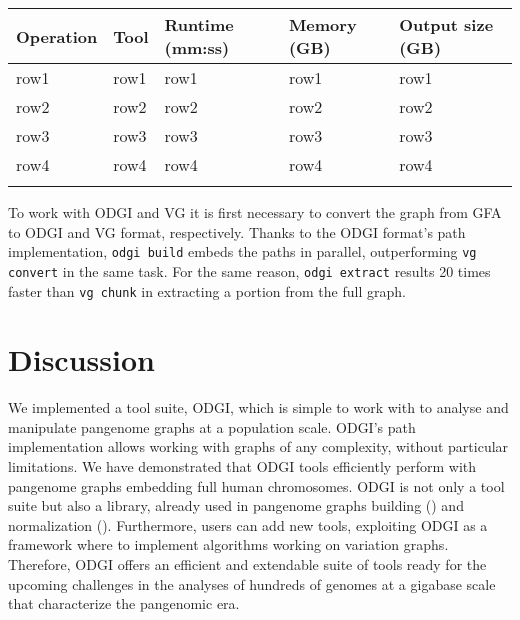 \documentclass{bioinfo}
\begin{document}
    \begin{table}[!t]
         {
            \begin{tabular}{@{}lllll@{}}
                \toprule Operation & Tool & Runtime (mm:ss) & Memory (GB) & Output size (GB) \\
                \midrule
                row1               & row1 & row1            & row1        & row1             \\
                row2               & row2 & row2            & row2        & row2             \\
                row3               & row3 & row3            & row3        & row3             \\
                row4               & row4 & row4            & row4        & row4             \\
                \botrule
            \end{tabular}}

    \end{table}

    To work with ODGI and VG it is first necessary to convert the graph from GFA to ODGI and VG format, respectively.
    Thanks to the ODGI format's path implementation, \texttt{odgi build} embeds the paths in parallel, outperforming
    \texttt{vg convert} in the same task. For the same reason, \texttt{odgi extract} results 20 times faster than
    \texttt{vg chunk} in extracting a portion from the full graph.


    \section{Discussion}
    We implemented a tool suite, ODGI, which is simple to work with to analyse and manipulate pangenome graphs at a
    population scale. ODGI's path implementation allows working with graphs of any complexity, without particular
    limitations. We have demonstrated that ODGI tools efficiently perform with pangenome graphs embedding full human
    chromosomes. ODGI is not only a tool suite but also a library, already used in pangenome graphs building
    (\citep{pggb}) and normalization (\citep{smoothxg}). Furthermore, users can add new tools, exploiting ODGI as a
    framework where to implement algorithms working on variation graphs. Therefore, ODGI offers an efficient and
    extendable suite of tools ready for the upcoming challenges in the analyses of hundreds of genomes at a gigabase
    scale that characterize the pangenomic era.
\end{document}
